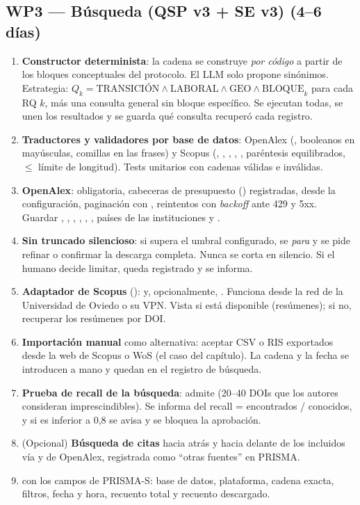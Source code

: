 \documentclass[11pt,a4paper]{article}
\newcommand{\WP}[1]{\textbf{\textcolor{palet}{WP#1}}}
\begin{document}
\subsection*{\WP{3} — Búsqueda (QSP v3 + SE v3) (4--6 días)}
\begin{enumerate}
  \item \textbf{Constructor determinista}: la cadena se construye \emph{por código} a partir de los bloques conceptuales del protocolo. El LLM solo propone sinónimos. Estrategia: $Q_k = \text{TRANSICIÓN} \wedge \text{LABORAL} \wedge \text{GEO} \wedge \text{BLOQUE}_k$ para cada RQ $k$, más una consulta general sin bloque específico. Se ejecutan todas, se unen los resultados y se guarda qué consulta recuperó cada registro.
  \item \textbf{Traductores y validadores por base de datos}: OpenAlex (, booleanos en mayúsculas, comillas en las frases) y Scopus (, , , , , paréntesis equilibrados, $\le$ límite de longitud). Tests unitarios con cadenas válidas e inválidas.
  \item \textbf{OpenAlex}:  obligatoria, cabeceras de presupuesto () registradas,  desde la configuración, paginación con , reintentos con \emph{backoff} ante 429 y 5xx. Guardar , , , , , , países de las instituciones y .
  \item \textbf{Sin truncado silencioso}: si  supera el umbral configurado, se \emph{para} y se pide refinar o confirmar la descarga completa. Nunca se corta en silencio. Si el humano decide limitar, queda registrado y se informa.
  \item \textbf{Adaptador de Scopus} ():  y, opcionalmente, . Funciona desde la red de la Universidad de Oviedo o su VPN. Vista  si está disponible (resúmenes); si no, recuperar los resúmenes por DOI.
  \item \textbf{Importación manual} como alternativa: aceptar CSV o RIS exportados desde la web de Scopus o WoS (el caso del capítulo). La cadena y la fecha se introducen a mano y quedan en el registro de búsqueda.
  \item \textbf{Prueba de recall de la búsqueda}:  admite  (20--40 DOIs que los autores consideran imprescindibles). Se informa del recall = encontrados / conocidos, y si es inferior a 0{,}8 se avisa y se bloquea la aprobación.
  \item (Opcional) \textbf{Búsqueda de citas} hacia atrás y hacia delante de los incluidos vía  y  de OpenAlex, registrada como ``otras fuentes'' en PRISMA.
  \item {} con los campos de PRISMA-S: base de datos, plataforma, cadena exacta, filtros, fecha y hora, recuento total y recuento descargado.
\end{enumerate}
\end{document}
